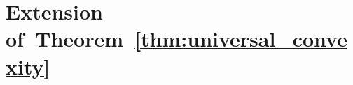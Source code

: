 \documentclass[twoside,11pt]{article}
\newcommand\mc{\mathcal}
\begin{document}

\section{\texorpdfstring{Extension of~Theorem~\ref{thm:universal_convexity}}{}}\label{app:extension}
\end{document}
